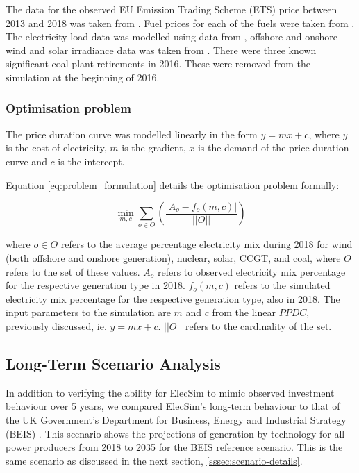 The data for the observed EU Emission Trading Scheme (ETS) price between 2013 and 2018 was taken from \cite{eu-ets}. Fuel prices for each of the fuels were taken from \cite{beis_fuel_price}. The electricity load data was modelled using data from \cite{gridwatch}, offshore and onshore wind and solar irradiance data was taken from \cite{Pfenninger2016}. There were three known significant coal plant retirements in 2016. These were removed from the simulation at the beginning of 2016.



\subsubsection{Optimisation problem}
\label{ssec:optimisation-problem}

The price duration curve was modelled linearly in the form $y=mx+c$, where $y$ is the cost of electricity, $m$ is the gradient, $x$ is the demand of the price duration curve and $c$ is the intercept.

Equation \ref{eq:problem_formulation} details the optimisation problem formally:

\begin{equation}
\label{eq:problem_formulation}
\min_{m,c} \sum\limits_{o\in O}\left(
\frac{\left|A_o-f_o(m,c)\right|}
{\left|\left|O\right|\right|}
\right)
\end{equation}

\noindent where $o\in O$ refers to the average percentage electricity mix during 2018 for wind (both offshore and onshore generation), nuclear, solar, CCGT, and coal, where $O$ refers to the set of these values. $A_o$ refers to observed electricity mix percentage for the respective generation type in 2018. $f_o(m,c)$ refers to the simulated electricity mix percentage for the respective generation type, also in 2018. The input parameters to the simulation are $m$ and $c$ from the linear $PPDC$, previously discussed, ie. $y=mx+c$. $\left|\left|O\right|\right|$ refers to the cardinality of the set.



\subsection{Long-Term Scenario Analysis}
\label{sssec:scen-analysis}

In addition to verifying the ability for ElecSim to mimic observed investment behaviour over 5 years, we compared ElecSim's long-term behaviour to that of the UK Government's Department for Business, Energy and Industrial Strategy (BEIS) \cite{DBEIS2019}. This scenario shows the projections of generation by technology for all power producers from 2018 to 2035 for the BEIS reference scenario. This is the same scenario as discussed in the next section, \ref{sssec:scenario-details}.

